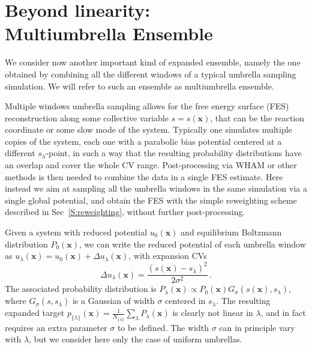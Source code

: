 \documentclass[aps,prx,reprint,superscriptaddress]{revtex4-1} %
\begin{document}
\section{Beyond linearity:\\Multiumbrella Ensemble\label{S:multiumbrellas}}
We consider now another important kind of expanded ensemble, namely the one obtained by combining all the different windows of a typical umbrella sampling simulation\cite{Sugita2000}.
We will refer to such an ensemble as multiumbrella ensemble.

Multiple windows umbrella sampling\cite{Kastner2011} allows for the free energy surface (FES) reconstruction along some collective variable $s=s(\mathbf{x})$, that can be the reaction coordinate or some slow mode of the system.
Typically one simulates multiple copies of the system, each one with a parabolic bias potential centered at a different $s_\lambda$-point, in such a way that the resulting probability distributions have an overlap and cover the whole CV range.
Post-processing via WHAM\cite{Kumar1992} or other methods is then needed to combine the data in a single FES estimate.
Here instead we aim at sampling all the umbrella windows in the same simulation via a single global potential, and obtain the FES with the simple reweighting scheme described in Sec~\ref{S:reweighting}, without further  post-processing.

Given a system with reduced potential $u_0(\mathbf{x})$ and equilibrium Boltzmann distribution $P_0(\mathbf{x})$, we can write the reduced potential of each umbrella window as $u_\lambda(\mathbf{x})=u_0(\mathbf{x})+\Delta u_\lambda(\mathbf{x})$, with expansion CVs
\begin{equation}\label{E:umbrella_ecv}
    \Delta u_\lambda(\mathbf{x})=\frac{(s(\mathbf{x})-s_\lambda)^2}{2\sigma^2}\, .
\end{equation}
The associated probability distribution is $P_\lambda(\mathbf{x}) \propto P_0(\mathbf{x})G_\sigma(s(\mathbf{x}),s_\lambda)$, where $G_\sigma(s,s_\lambda)$ is a Gaussian of width $\sigma$ centered in $s_\lambda$.
The resulting expanded target $p_{\{\lambda\}}(\mathbf{x})=\frac{1}{N_{\{\lambda\}}}\sum_\lambda P_\lambda(\mathbf{x})$ is clearly not linear in $\lambda$, and in fact requires an extra parameter $\sigma$ to be defined.
The width $\sigma$ can in principle vary with $\lambda$, but we consider here only the case of uniform umbrellas.
\end{document}

